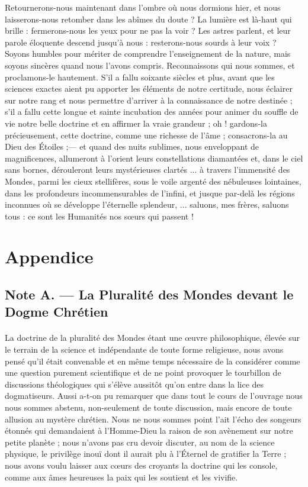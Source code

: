 \documentclass[a4paper, 11pt, oneside, landscape]{article}
\begin{document}
Retournerons-nous maintenant dans l'ombre où nous dormions hier, et nous laisserons-nous retomber dans les abîmes du doute ? La lumière est là-haut qui brille : fermerons-nous les yeux pour ne pas la voir ? Les astres parlent, et leur parole éloquente descend jusqu'à nous : resterons-nous sourds à leur voix ? Soyons humbles pour mériter de comprendre l'enseignement de la nature, mais soyons sincères quand nous l'avons compris. Reconnaissons qui nous sommes, et proclamons-le hautement. S'il a fallu soixante siècles et plus, avant que les sciences exactes aient pu apporter les éléments de notre certitude, nous éclairer sur notre rang et nous permettre d'arriver à la connaissance de notre destinée ; s'il a fallu cette longue et sainte incubation des années pour animer du souffle de vie notre belle doctrine et en affirmer la vraie grandeur ; oh ! gardons-la précieusement, cette doctrine, comme une richesse de l'âme ; consacrons-la au Dieu des Étoiles ;--- et quand des nuits sublimes, nous enveloppant de magnificences, allumeront à l'orient leurs constellations diamantées et, dans le ciel sans bornes, dérouleront leurs mystérieuses clartés ... à travers l'immensité des Mondes, parmi les cieux stellifères, sous le voile argenté des nébuleuses lointaines, dans les profondeurs incommensurables de l'infini, et jusque par-delà les régions inconnues où se développe l'éternelle splendeur, ... saluons, mes frères, saluons tous : ce sont les Humanités nos sœurs qui passent !
\clearpage
\section{Appendice}
\subsection{Note A. --- La Pluralité des Mondes devant le Dogme Chrétien}
\paragraph{}
La doctrine de la pluralité des Mondes étant une œuvre philosophique, élevée sur le terrain de la science et indépendante de toute forme religieuse, nous avons pensé qu'il était convenable et en même temps nécessaire de la considérer comme une question purement scientifique et de ne point provoquer le tourbillon de discussions théologiques qui s'élève aussitôt qu'on entre dans la lice des dogmatiseurs. Aussi a-t-on pu remarquer que dans tout le cours de l'ouvrage nous nous sommes abstenu, non-seulement de toute discussion, mais encore de toute allusion au mystère chrétien. Nous ne nous sommes point l'ait l'écho des songeurs étonnés qui demandaient à l'Homme-Dieu la raison de son avènement sur notre petite planète ; nous n'avons pas cru devoir discuter, au nom de la science physique, le privilège inouï dont il aurait plu à l'Éternel de gratifier la Terre ; nous avons voulu laisser aux cœurs des croyants la doctrine qui les console, comme aux âmes heureuses la paix qui les soutient et les vivifie.
\end{document}
